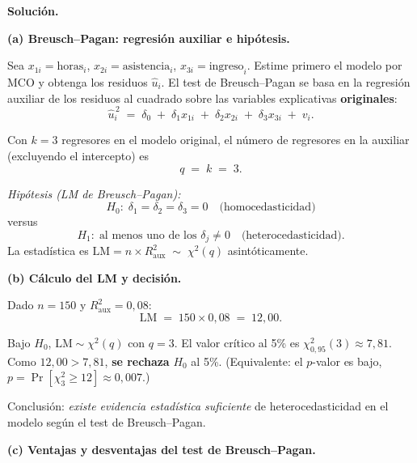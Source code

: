 \documentclass[10pt,a4paper]{article}
\begin{document}
\begin{enumerate}
 
\vspace{0.5cm}
 
\textbf{Solución.}
 
\vspace{0.3cm}
 
\noindent\textbf{(a) Breusch--Pagan: regresión auxiliar e hipótesis.}
 
Sea $x_{1i} = \text{horas}_i$, $x_{2i} = \text{asistencia}_i$, $x_{3i} = \text{ingreso}_i$. Estime primero el modelo por MCO y obtenga los residuos $\hat{u}_i$. El test de Breusch--Pagan se basa en la regresión auxiliar de los residuos al cuadrado sobre las variables explicativas \textbf{originales}:
\[
\hat{u}_i^{\,2} \;=\; \delta_0 \;+\; \delta_1 x_{1i} \;+\; \delta_2 x_{2i} \;+\; \delta_3 x_{3i} \;+\; v_i.
\]
 
Con $k = 3$ regresores en el modelo original, el número de regresores en la auxiliar (excluyendo el intercepto) es
\[
q \;=\; k \;=\; 3.
\]
 
\noindent\emph{Hipótesis (LM de Breusch--Pagan):}
\[
H_0:\; \delta_1 = \delta_2 = \delta_3 = 0 \quad \text{(homocedasticidad)}
\]
versus
\[
H_1:\; \text{al menos uno de los } \delta_j \neq 0 \quad \text{(heterocedasticidad)}.
\]
La estadística es $\text{LM} = n \times R^2_{\text{aux}} \;\sim\; \chi^2(q)$ asintóticamente.
 
\vspace{0.5cm}
 
\noindent\textbf{(b) Cálculo del LM y decisión.}
 
Dado $n = 150$ y $R^2_{\text{aux}} = 0{,}08$:
\[
\text{LM} \;=\; 150 \times 0{,}08 \;=\; 12{,}00.
\]
 
Bajo $H_0$, $\text{LM} \sim \chi^2(q)$ con $q = 3$. El valor crítico al 5\% es $\chi^2_{0{,}95}(3) \approx 7{,}81$. Como $12{,}00 > 7{,}81$, \textbf{se rechaza} $H_0$ al 5\%. (Equivalente: el $p$-valor es bajo, $p = \Pr[\chi^2_3 \geq 12] \approx 0{,}007$.)
 
\noindent Conclusión: \emph{existe evidencia estadística suficiente} de heterocedasticidad en el modelo según el test de Breusch--Pagan.
 
\vspace{0.5cm}
 
\noindent\textbf{(c) Ventajas y desventajas del test de Breusch--Pagan.}
 

\end{enumerate}
\end{document}
